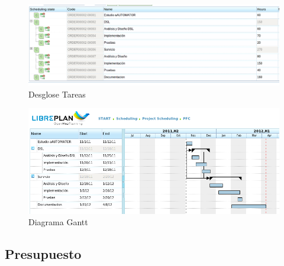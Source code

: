 \begin{landscape}
  \begin{figure}[hbp]
    \begin{center}
      \includegraphics[width=1.4\textwidth]{tasks-structure.png}
    \end{center}
  \caption{Desglose Tareas}\label{tasks_structure}
  \end{figure}
\end{landscape}
\begin{landscape}
  \begin{figure}[hbp]
    \begin{center}
      \includegraphics[width=1.4\textwidth]{gantt-diagram.png}
    \end{center}
  \caption{Diagrama Gantt}\label{gantt_diagram}
  \end{figure}
\end{landscape}
\subsection{Presupuesto}

